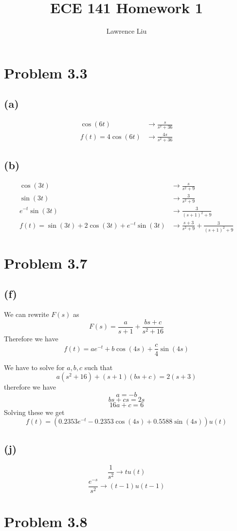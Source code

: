 \documentclass[12pt]{article}
\title{ECE 141 Homework 1}
\author{Lawrence Liu}
\begin{document}
\maketitle
\section*{Problem 3.3}
\subsection*{(a)}
\begin{align*}
\cos(6t)&\to\frac{s}{s^2+36}\\
f(t)=4\cos(6t)&\to\boxed{\frac{4s}{s^2+36}}
\end{align*}

\subsection*{(b)}
\begin{align*}
\cos(3t)&\to\frac{s}{s^2+9}\\
\sin(3t)&\to\frac{3}{s^2+9}\\
e^{-t}\sin(3t)&\to\frac{3}{(s+1)^2+9}\\
f(t)=\sin(3t)+2\cos(3t)+e^{-t}\sin(3t)&\to\frac{s+3}{s^2+9}+\frac{3}{(s+1)^2+9}
\end{align*}
\section*{Problem 3.7}
\subsection*{(f)}
We can rewrite $F(s)$ as
$$F(s)=\frac{a}{s+1}+\frac{bs+c}{s^2+16}$$
Therefore we have
$$f(t)=ae^{-t}+b\cos(4s)+\frac{c}{4}\sin(4s)$$


We have to solve for $a,b,c$ such that
$$a(s^2+16)+(s+1)(bs+c)=2(s+3)$$
therefore we have
$$a=-b$$
$$bs+cs=2s$$
$$16a+c=6$$
Solving these we get
$$f(t)=\boxed{\left(0.2353e^{-t}-0.2353\cos(4s)+0.5588\sin(4s)\right)u(t)}$$

\subsection*{(j)}
$$\frac{1}{s^2}\to tu(t)$$
$$\frac{e^{-s}}{s^2}\to \boxed{(t-1)u(t-1)}$$

\section*{Problem 3.8}
\end{document}
